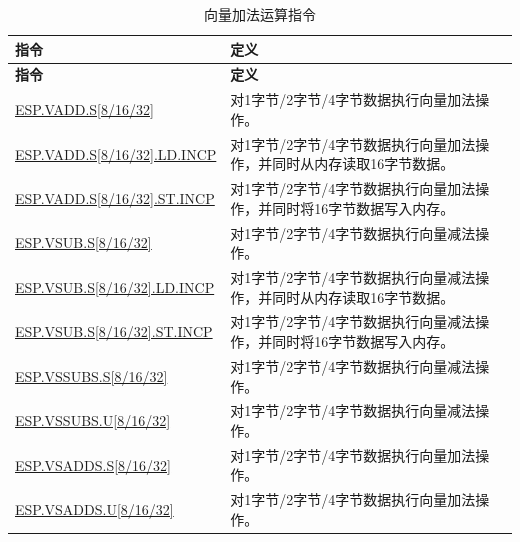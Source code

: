 \begin{longtable}[c]{|l|m{10cm}|}
    \caption{向量加法运算指令}
    \label{tab:pie-vadd-instructions}\\
    \hline
    \rowcolor{lightgray}
    \textbf{指令} & \textbf{定义} \\\hline
    \endfirsthead
    \rowcolor{lightgray}
    \textbf{指令} & \textbf{定义} \\\hline
    \endhead
    \endfoot

    \hyperref[instruction:ESPVADDS8]{ESP.VADD.S[8/16/32]} & 对1字节/2字节/4字节数据执行向量加法操作。 \\\hline
    \hyperref[instruction:ESPVADDS8LDINCP]{ESP.VADD.S[8/16/32].LD.INCP} & 对1字节/2字节/4字节数据执行向量加法操作，并同时从内存读取16字节数据。 \\\hline
    \hyperref[instruction:ESPVADDS8STINCP]{ESP.VADD.S[8/16/32].ST.INCP} & 对1字节/2字节/4字节数据执行向量加法操作，并同时将16字节数据写入内存。 \\\hline
    \hyperref[instruction:ESPVSUBS8]{ESP.VSUB.S[8/16/32]} & 对1字节/2字节/4字节数据执行向量减法操作。 \\\hline
    \hyperref[instruction:ESPVSUBS8LDINCP]{ESP.VSUB.S[8/16/32].LD.INCP} & 对1字节/2字节/4字节数据执行向量减法操作，并同时从内存读取16字节数据。 \\\hline
    \hyperref[instruction:ESPVSUBS8STINCP]{ESP.VSUB.S[8/16/32].ST.INCP} & 对1字节/2字节/4字节数据执行向量减法操作，并同时将16字节数据写入内存。 \\\hline
    \hyperref[instruction:ESPVSSUBSS8]{ESP.VSSUBS.S[8/16/32]} & 对1字节/2字节/4字节数据执行向量减法操作。 \\\hline
    \hyperref[instruction:ESPVSSUBSU8]{ESP.VSSUBS.U[8/16/32]} & 对1字节/2字节/4字节数据执行向量减法操作。 \\\hline
    \hyperref[instruction:ESPVSADDSS8]{ESP.VSADDS.S[8/16/32]} & 对1字节/2字节/4字节数据执行向量加法操作。 \\\hline
    \hyperref[instruction:ESPVSADDSU8]{ESP.VSADDS.U[8/16/32]} & 对1字节/2字节/4字节数据执行向量加法操作。 \\\hline
\end{longtable}